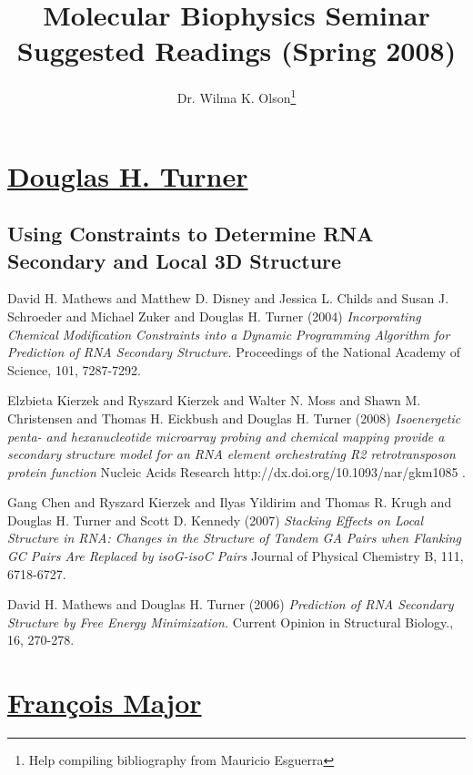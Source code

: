 \title{Molecular Biophysics Seminar Suggested Readings (Spring 2008)}
\author{Dr. Wilma K. Olson\thanks{Help compiling bibliography from Mauricio Esguerra}}
\maketitle

\label{readings} 


\section*{\underline{Douglas H. Turner}}
\subsection*{Using Constraints to Determine RNA Secondary and Local 3D Structure}

\begin{thebibliography}{1}
 David H. Mathews and Matthew D. Disney and
Jessica L. Childs and Susan J. Schroeder and Michael Zuker and
Douglas H. Turner (2004) {\em Incorporating Chemical Modification Constraints into
a Dynamic Programming Algorithm for Prediction
of RNA Secondary Structure.} Proceedings of the National Academy of
Science, 101, 7287-7292.

 Elzbieta Kierzek and Ryszard Kierzek and Walter N. Moss and 
Shawn M. Christensen and Thomas H. Eickbush and Douglas H. Turner
(2008) {\em
Isoenergetic penta- and hexanucleotide microarray probing and
chemical mapping provide a secondary structure model for an RNA
element orchestrating R2 retrotransposon protein function} Nucleic
Acids Research http://dx.doi.org/10.1093/nar/gkm1085  .

 Gang Chen and Ryszard Kierzek and Ilyas Yildirim and Thomas R. Krugh
and Douglas H. Turner and Scott D. Kennedy (2007) {\em Stacking
Effects on Local Structure in RNA: Changes in the Structure of
Tandem GA Pairs when Flanking GC Pairs Are Replaced by isoG-isoC
Pairs} Journal of Physical Chemistry B, 111, 6718-6727.

 David H. Mathews and Douglas H. Turner (2006) 
{\em Prediction of RNA Secondary Structure by Free Energy
Minimization.} Current Opinion in Structural Biology., 16, 270-278.
\end{thebibliography}

\newpage

\section*{\underline{Fran\c cois Major}}
